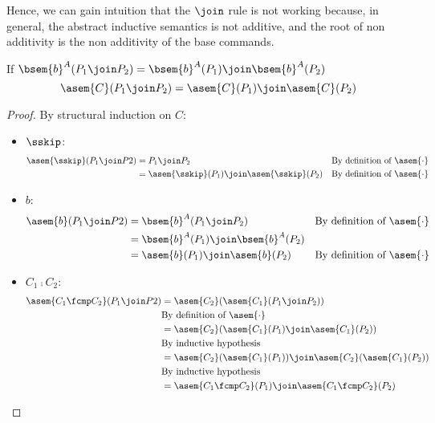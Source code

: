 Hence, we can gain intuition that the $\join$ rule is not working because, in
general, the abstract inductive semantics is not additive, and the root of non
additivity is the non additivity of the base commands.

\begin{theorem} $\;$\\
  \label{thm:additivity}
  If $\bsem{b}^A(P_1 \join P_2) = \bsem{b}^A(P_1) \join \bsem{b}^A(P_2)$
  $$\asem{C}(P_1 \join P_2) = \asem{C}(P_1) \join \asem{C}(P_2)$$
\end{theorem}
\begin{proof}
  By structural induction on $C$:
  \begin{itemize}
    \item $\sskip$:
      \begin{align*}
        \asem{\sskip}(P_1 \join P2)
          &= P_1 \join P_2 
          &\text{By definition of $\asem{\cdot}$} \\
          &= \asem{\sskip}(P_1) \join \asem{\sskip}(P_2)
          &\text{By definition of $\asem{\cdot}$} \\
      \end{align*}
    \item $b$:
      \begin{align*}
        \asem{b}(P_1 \join P2)
          &= \bsem{b}^A(P_1 \join P_2)
          &\text{By definition of $\asem{\cdot}$} \\
          &= \bsem{b}^A(P_1) \join \bsem{b}^A(P_2) \\
          &= \asem{b}(P_1) \join \asem{b}(P_2)
          &\text{By definition of $\asem{\cdot}$} \\
      \end{align*}
    \item $C_1 \fcmp C_2$:
      \begin{align*}
        \asem{C_1 \fcmp C_2}(P_1 \join P2)
          &= \asem{C_2}(\asem{C_1}(P_1 \join P_2)) \\
          &\text{By definition of $\asem{\cdot}$} \\
          &= \asem{C_2}(\asem{C_1}(P_1) \join \asem{C_1}(P_2)) \\
          &\text{By inductive hypothesis} \\
          &= \asem{C_2}(\asem{C_1}(P_1)) \join \asem{C_2}(\asem{C_1}(P_2)) \\
          &\text{By inductive hypothesis} \\
          &= \asem{C_1 \fcmp C_2}(P_1) \join \asem{C_1 \fcmp C_2}(P_2) \\

\end{align*}
\end{itemize}
\end{proof}
